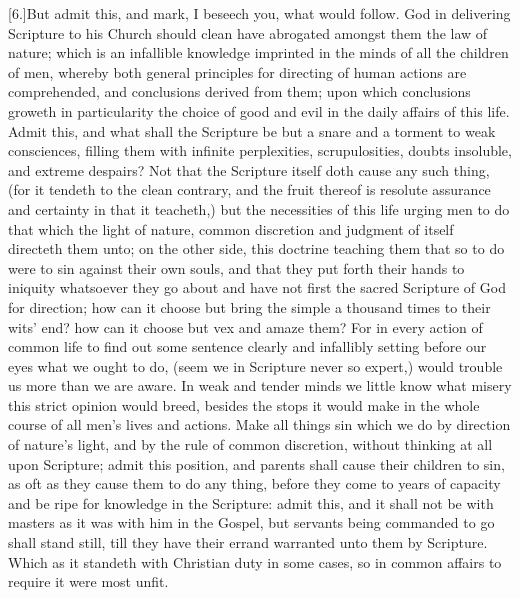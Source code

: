 [6.]But admit this, and mark, I beseech you, what would follow. God in delivering Scripture to his Church should clean have abrogated amongst them the law of nature; which is an infallible knowledge imprinted in the minds of all the children of men, whereby both general principles for directing of human actions are comprehended, and conclusions derived from them; upon which conclusions groweth in particularity  the choice of good and evil in the daily affairs of this life. Admit this, and what shall the Scripture be but a snare and a torment to weak consciences, filling them with infinite perplexities, scrupulosities, doubts insoluble, and extreme despairs? Not that the Scripture itself doth cause any such thing, (for it tendeth to the clean contrary, and the fruit thereof is resolute assurance and certainty in that it teacheth,) but the necessities of this life urging men to do that which the light of nature, common discretion and judgment of itself directeth them unto; on the other side, this doctrine teaching them that so to do were to sin against their own souls, and that they put forth their hands to iniquity whatsoever they go about and have not first the sacred Scripture of God for direction; how can it choose but bring the simple a thousand times to their wits’ end? how can it choose but vex and amaze them? For in every action of common life to find out some sentence clearly and infallibly setting before our eyes what we ought to do, (seem we in Scripture never so expert,) would trouble us more than we are aware. In weak and tender minds we little know what misery this strict opinion would breed, besides the stops it would make in the whole course of all men’s lives and actions. Make all things sin which we do by direction of nature’s light, and by the rule of common discretion, without thinking at all upon Scripture; admit this position, and parents shall cause their children to sin, as oft as they cause them to do any thing, before they come to years of capacity and be ripe for knowledge in the Scripture: admit this, and it shall not be with masters as it was with him in the Gospel, but servants being commanded to go shall stand still, till they have their errand warranted unto them by Scripture. Which as it standeth with Christian duty in some cases, so in common affairs to require it were most unfit.


